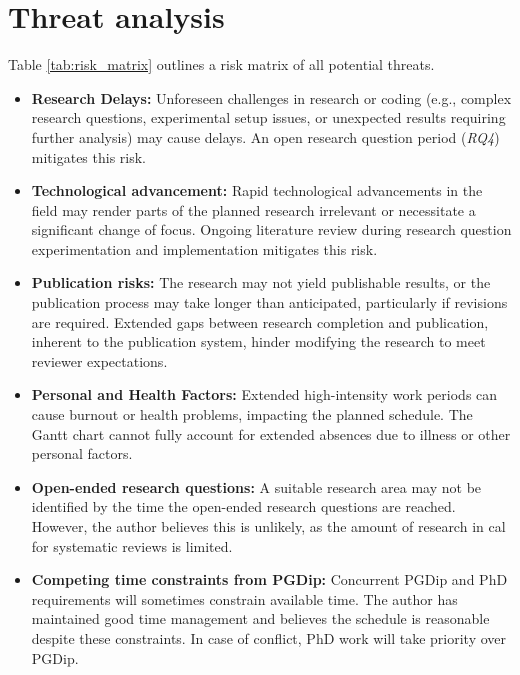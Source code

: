 \documentclass[10pt,oneside]{book}
\begin{document}
\section{Threat analysis}

Table \ref{tab:risk_matrix} outlines a risk matrix of all potential threats.

\begin{itemize}
    \item \textbf{Research Delays:} Unforeseen challenges in research or coding (e.g., complex research questions, experimental setup issues, or unexpected results requiring further analysis) may cause delays.  An open research question period (\emph{RQ4}) mitigates this risk.
    \item \textbf{Technological advancement:} Rapid technological advancements in the field may render parts of the planned research irrelevant or necessitate a significant change of focus. Ongoing literature review during research question experimentation and implementation mitigates this risk.
    \item \textbf{Publication risks:} 
    The research may not yield publishable results, or the publication process may take longer than anticipated, particularly if revisions are required. Extended gaps between research completion and publication, inherent to the publication system, hinder modifying the research to meet reviewer expectations.
    \item \textbf{Personal and Health Factors:} Extended high-intensity work periods can cause burnout or health problems, impacting the planned schedule. The Gantt chart cannot fully account for extended absences due to illness or other personal factors.
    \item \textbf{Open-ended research questions:} A suitable research area may not be identified by the time the open-ended research questions are reached. However, the author believes this is unlikely, as the amount of research in \gls*{cal} for systematic reviews is limited.
    \item \textbf{Competing time constraints from PGDip:} Concurrent PGDip and PhD requirements will sometimes constrain available time. The author has maintained good time management and believes the schedule is reasonable despite these constraints. In case of conflict, PhD work will take priority over PGDip.
\end{itemize}
\end{document}
